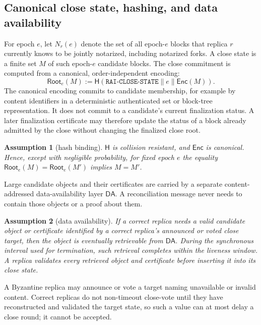 \documentclass[11pt]{article}
\newtheorem{assumption}{Assumption}
\theoremstyle{remark}
\newcommand{\hash}{\mathsf{H}}
\newcommand{\Root}{\mathsf{Root}}
\newcommand{\Enc}{\mathsf{Enc}}
\newcommand{\DA}{\mathsf{DA}}
\begin{document}
\subsection{Canonical close state, hashing, and data availability}

For epoch $e$, let $N_r(e)$ denote the set of all epoch-$e$ blocks that replica $r$ currently knows to be jointly notarized, including notarized forks. A close state is a finite set $M$ of such epoch-$e$ candidate blocks. The close commitment is computed from a canonical, order-independent encoding:
\begin{equation}
  \Root_e(M)
  :=
  \hash(\texttt{RAI-CLOSE-STATE}\parallel e\parallel \Enc(M)).
  \label{eq:close-root}
\end{equation}
The canonical encoding commits to candidate membership, for example by content identifiers in a deterministic authenticated set or block-tree representation. It does not commit to a candidate's current finalization status. A later finalization certificate may therefore update the status of a block already admitted by the close without changing the finalized close root.

\begin{assumption}[hash binding]
\label{ass:hash}
$\hash$ is collision resistant, and $\Enc$ is canonical. Hence, except with negligible probability, for fixed epoch $e$ the equality $\Root_e(M)=\Root_e(M')$ implies $M=M'$.
\end{assumption}

Large candidate objects and their certificates are carried by a separate content-addressed data-availability layer $\DA$. A reconciliation message never needs to contain those objects or a proof about them.

\begin{assumption}[data availability]
\label{ass:da}
If a correct replica needs a valid candidate object or certificate identified by a correct replica's announced or voted close target, then the object is eventually retrievable from $\DA$. During the synchronous interval used for termination, such retrieval completes within the liveness window. A replica validates every retrieved object and certificate before inserting it into its close state.
\end{assumption}

A Byzantine replica may announce or vote a target naming unavailable or invalid content. Correct replicas do not non-timeout close-vote until they have reconstructed and validated the target state, so such a value can at most delay a close round; it cannot be accepted.
\end{document}
